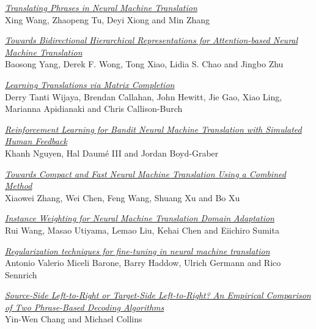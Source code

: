 \hyperlink{page.1430}{\em Translating Phrases in Neural Machine Translation}\samepage \\
\hspace*{7mm} Xing Wang, Zhaopeng Tu, Deyi Xiong and Min Zhang\dotfill {}

\hyperlink{page.1441}{\em Towards Bidirectional Hierarchical Representations for Attention-based Neural Machine Translation}\samepage \\
\hspace*{7mm} Baosong Yang, Derek F. Wong, Tong Xiao, Lidia S. Chao and Jingbo Zhu\dotfill {}

\hyperlink{page.1451}{\em Learning Translations via Matrix Completion}\samepage \\
\hspace*{7mm} Derry Tanti Wijaya, Brendan Callahan, John Hewitt, Jie Gao, Xiao Ling, Marianna Apidianaki and Chris Callison-Burch\dotfill {}

\hyperlink{page.1463}{\em Reinforcement Learning for Bandit Neural Machine Translation with Simulated Human Feedback}\samepage \\
\hspace*{7mm} Khanh Nguyen, Hal Daum\'{e} III and Jordan Boyd-Graber\dotfill {}

\hyperlink{page.1474}{\em Towards Compact and Fast Neural Machine Translation Using a Combined Method}\samepage \\
\hspace*{7mm} Xiaowei Zhang, Wei Chen, Feng Wang, Shuang Xu and Bo Xu\dotfill {}

\hyperlink{page.1481}{\em Instance Weighting for Neural Machine Translation Domain Adaptation}\samepage \\
\hspace*{7mm} Rui Wang, Masao Utiyama, Lemao Liu, Kehai Chen and Eiichiro Sumita\dotfill {}

\hyperlink{page.1488}{\em Regularization techniques for fine-tuning in neural machine translation}\samepage \\
\hspace*{7mm} Antonio Valerio Miceli Barone, Barry Haddow, Ulrich Germann and Rico Sennrich\dotfill {}

\hyperlink{page.1494}{\em Source-Side Left-to-Right or Target-Side Left-to-Right? An Empirical Comparison of Two Phrase-Based Decoding Algorithms}\samepage \\
\hspace*{7mm} Yin-Wen Chang and Michael Collins\dotfill {}

